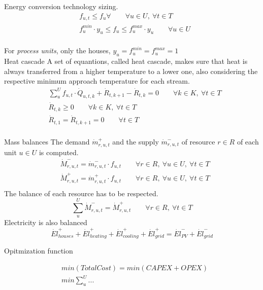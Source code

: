 \documentclass{article}
\begin{document}
Energy conversion technology sizing.
\begin{align}
& f_{u,t} \leq f_{u} \forall \qquad \forall u \in U, \ \forall t \in T  \\
& f_{u}^{min} \cdot y_{u} \leq f_{u} \leq f_{u}^{max} \cdot y_{u} \qquad \forall u \in U\\
\end{align}

For \textit{process units}, only the houses, $y_{u} = f_{u}^{min} = f_{u}^{max} = 1$\\

Heat cascade
A set of equantions, called heat cascade, makes sure that heat is always transferred from a higher temperature to a lower one, also considering the respective minimum approach temperature for each stream.
\begin{align}
& \sum_{u}^{U} f_{u,t}  \cdot \dot{Q}_{u,t,k} + \dot{R}_{t,k+1} - \dot{R}_{t,k} = 0 \qquad \forall k \in K, \ \forall t \in T \\
& \dot{R}_{t,k} \geq 0 \qquad \forall k \in K, \ \forall t \in T  \\
& \dot{R}_{t,1} = \dot{R}_{t,k+1} = 0 \qquad \forall t \in T  \\
\end{align}

Mass balances
The demand $\dot{m}_{r,u,t}^{+}$ and the supply $\dot{m}_{r,u,t}^{-}$ of resource $r \in R$ of each unit $u \in U$ is computed.
\begin{align}
& \dot{M}_{r,u,t}^{-} = \dot{m}_{r,u,t}^{-} \cdot f_{u,t} \qquad \forall r \in R, \ \forall u \in U, \ \forall t \in T \\
& \dot{M}_{r,u,t}^{+} = \dot{m}_{r,u,t}^{+} \cdot f_{u,t} \qquad \forall r \in R, \ \forall u \in U, \ \forall t \in T  \\
\end{align}
The balance of each resource has to be respected.
\begin{equation}
\sum_{u}^{U} \dot{M}_{r,u,t}^{-} = \dot{M}_{r,u,t}^{+} \qquad \forall r \in R, \ \forall t \in T
\end{equation}
Electricity is also balanced
\begin{equation}
\dot{El}_{houses}^{+} + \dot{El}_{heating}^{+} + \dot{El}_{cooling}^{+} + \dot{El}_{grid}^{+} = \dot{El}_{PV}^{-} + \dot{El}_{grid}^{-}
\end{equation}

Opitmization function

\begin{align}
& min \left( TotalCost \right)  = min \left(  CAPEX + OPEX \right) \\
& min \sum_{u}^{U} ... \\
\end{align}
\end{document}
